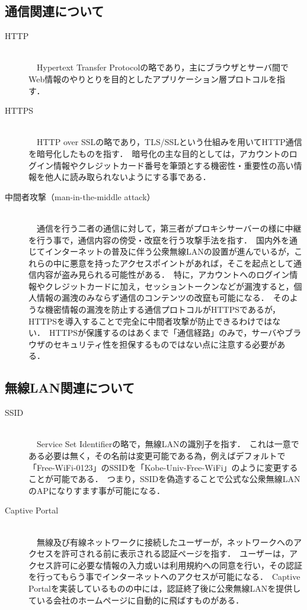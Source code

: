\documentclass[dvipdfmx]{jsarticle}
\begin{document}
        \subsection{通信関連について}
            \begin{description}
                \item[HTTP]\mbox{}\\
                    　Hypertext Transfer Protocolの略であり，主にブラウザとサーバ間でWeb情報のやりとりを目的としたアプリケーション層プロトコルを指す．\
                \item[HTTPS]\mbox{}\\ 
                    　HTTP over SSLの略であり，TLS/SSLという仕組みを用いてHTTP通信を暗号化したものを指す．\
                    暗号化の主な目的としては，アカウントのログイン情報やクレジットカード番号を筆頭とする機密性・重要性の高い情報を他人に読み取られないようにする事である．\
                \item[中間者攻撃（man-in-the-middle attack）]\mbox{}\\ 
                    　通信を行う二者の通信に対して，第三者がプロキシサーバーの様に中継を行う事で，通信内容の傍受・改竄を行う攻撃手法を指す．\
                    国内外を通じてインターネットの普及に伴う公衆無線LANの設置が進んでいるが，これらの中に悪意を持ったアクセスポイントがあれば，そこを起点として通信内容が盗み見られる可能性がある．\
                    特に，アカウントへのログイン情報やクレジットカードに加え，セッショントークンなどが漏洩すると，個人情報の漏洩のみならず通信のコンテンツの改竄も可能になる．\
                    そのような機密情報の漏洩を防止する通信プロトコルがHTTPSであるが，HTTPSを導入することで完全に中間者攻撃が防止できるわけではない．\
                    HTTPSが保護するのはあくまで「通信経路」のみで，サーバやブラウザのセキュリティ性を担保するものではない点に注意する必要がある\cite{AboutMITM}．\
            \end{description}
        \subsection{無線LAN関連について}
            \begin{description}
                \item [SSID]\mbox{}\\
                    　Service Set Identifierの略で，無線LANの識別子を指す．\
                    これは一意である必要は無く，その名前は変更可能である為，例えばデフォルトで「Free-WiFi-0123」のSSIDを「Kobe-Univ-Free-WiFi」のように変更することが可能である．\
                    つまり，SSIDを偽造することで公式な公衆無線LANのAPになりすます事が可能になる．\
                \item [Captive Portal]\mbox{}\\
                    　無線及び有線ネットワークに接続したユーザーが，ネットワークへのアクセスを許可される前に表示される認証ページを指す．\
                    ユーザーは，アクセス許可に必要な情報の入力或いは利用規約への同意を行い，その認証を行ってもらう事でインターネットへのアクセスが可能になる．\
                    Captive Portalを実装しているものの中には，認証終了後に公衆無線LANを提供している会社のホームページに自動的に飛ばすものがある．\
            \end{description}
\end{document}
